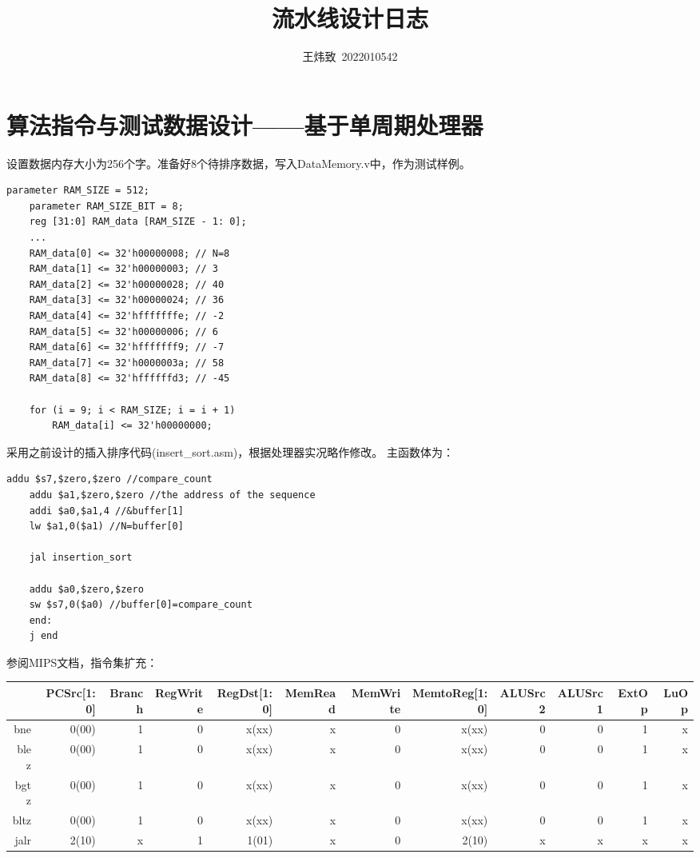 \documentclass[10pt]{article}
\title{流水线设计日志}
\author{王炜致\ 2022010542}
\date{}
\begin{document}
\maketitle
\section{算法指令与测试数据设计——基于单周期处理器}
设置数据内存大小为256个字。准备好8个待排序数据，写入DataMemory.v中，作为测试样例。
\begin{lstlisting}[style={verilog-style}]
    parameter RAM_SIZE = 512;
    parameter RAM_SIZE_BIT = 8;
    reg [31:0] RAM_data [RAM_SIZE - 1: 0];
    ...
    RAM_data[0] <= 32'h00000008; // N=8
    RAM_data[1] <= 32'h00000003; // 3
    RAM_data[2] <= 32'h00000028; // 40
    RAM_data[3] <= 32'h00000024; // 36
    RAM_data[4] <= 32'hfffffffe; // -2
    RAM_data[5] <= 32'h00000006; // 6
    RAM_data[6] <= 32'hfffffff9; // -7
    RAM_data[7] <= 32'h0000003a; // 58
    RAM_data[8] <= 32'hffffffd3; // -45

    for (i = 9; i < RAM_SIZE; i = i + 1)
        RAM_data[i] <= 32'h00000000;
\end{lstlisting}

采用之前设计的插入排序代码(insert\_sort.asm)，根据处理器实况略作修改。
主函数体为：
\begin{lstlisting}[style={verilog-style}]
    addu $s7,$zero,$zero //compare_count
    addu $a1,$zero,$zero //the address of the sequence 
    addi $a0,$a1,4 //&buffer[1]
    lw $a1,0($a1) //N=buffer[0]
 
    jal insertion_sort
 
    addu $a0,$zero,$zero
    sw $s7,0($a0) //buffer[0]=compare_count
    end:
    j end
\end{lstlisting}

参阅MIPS文档，指令集扩充：
\begin{table}[h]
    \footnotesize
\begin{center}
    \begin{tabular}{|r|r|r|r|r|r|r|r|r|r|r|r|}
        \hline
        &PCSrc[1:0]& Branch & RegWrite & RegDst[1:0] & MemRead & MemWrite & MemtoReg[1:0] & ALUSrc2 & ALUSrc1 & ExtOp & LuOp\\
        \hline
        bne & 0(00) & 1 & 0 & x(xx) & x & 0 & x(xx) & 0 & 0 & 1 & x\\
        \hline
        blez& 0(00) & 1 & 0 & x(xx) & x & 0 & x(xx) & 0 & 0 & 1 & x\\
        \hline
        bgtz& 0(00) & 1 & 0 & x(xx) & x & 0 & x(xx) & 0 & 0 & 1 & x\\
        \hline
        bltz& 0(00) & 1 & 0 & x(xx) & x & 0 & x(xx) & 0 & 0 & 1 & x\\
        \hline
        jalr& 2(10) & x & 1 & 1(01) & x & 0 & 2(10) & x & x & x & x\\
        \hline
    \end{tabular}
\end{center}
\end{table}
\end{document}
